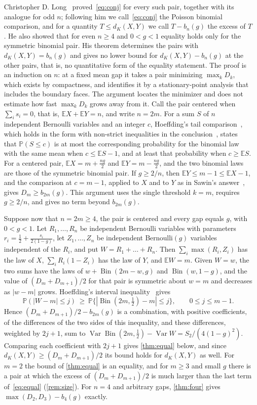 \documentclass[11pt,a4paper]{article}
\numberwithin{equation}{section}
\theoremstyle{remark}
\newcommand{\Pp}{\mathbb P}
\newcommand{\E}{\mathbb E}
\newcommand{\Bin}{\operatorname{Bin}}
\begin{document}
Christopher D. Long~\cite[Theorem~1.1]{Long} proved~\eqref{eq:conj} for every such pair, together
with its analogue for odd $n$; following him we call~\eqref{eq:conj} the Poisson binomial comparison, and for a quantity $T\le d_K(X,Y)$ we call $T-b_n(g)$ the excess of $T$. He also showed that for even $n\ge4$ and $0<g<1$ equality holds only for
the symmetric binomial pair. His theorem determines the pairs with $d_K(X,Y)=b_n(g)$ and gives no
lower bound for $d_K(X,Y)-b_n(g)$ at the other pairs, that is, no quantitative form of the equality statement. The proof is an induction on $n$: at a fixed mean gap it takes a pair minimizing $\max_kD_k$, which exists by compactness, and identifies it by a stationary-point analysis that includes the boundary faces. The argument locates the minimizer and does not estimate how fast $\max_kD_k$ grows away from it. Call the pair centered when $\sum_is_i=0$,
that is, $\E X+\E Y=n$, and write $n=2m$. For a sum $S$ of $n$ independent Bernoulli variables and an
integer $c$, Hoeffding's tail comparison~\cite[Theorem~4]{Hoeffding}, which holds in the form with non-strict
inequalities in the conclusion~\cite[Theorem~2.1(1)]{TangTang}, states that $\Pp(S\le c)$ is at most the
corresponding probability for the binomial law with the same mean when $c\le\E S-1$, and at least
that probability when $c\ge\E S$. For a centered pair, $\E X=m+\frac{ng}2$ and
$\E Y=m-\frac{ng}2$, and the two binomial laws are those of the symmetric binomial pair. If
$g\ge2/n$, then $\E Y\le m-1\le\E X-1$, and the comparison at $c=m-1$, applied to $X$ and to $Y$ as
in Sawin's answer~\cite{Sawin}, gives $D_m\ge b_{2m}(g)$. This argument uses the single threshold $k=m$, requires
$g\ge2/n$, and gives no term beyond $b_{2m}(g)$.

Suppose now that $n=2m\ge4$, the pair is centered and every gap equals $g$, with $0<g<1$. Let $R_1,\dots,R_n$ be independent Bernoulli
variables with parameters $r_i=\frac12+\frac{s_i}{2(1-g)}$, let $Z_1,\dots,Z_n$ be independent
Bernoulli$(g)$ variables independent of the $R_i$, and put $W=R_1+\dots+R_n$. Then
$\sum_i\max(R_i,Z_i)$ has the law of $X$, $\sum_iR_i(1-Z_i)$ has the law of $Y$, and $\E W=m$.
Given $W=w$, the two sums have the laws of $w+\Bin(2m-w,g)$ and $\Bin(w,1-g)$, and the value of
$(D_m+D_{m+1})/2$ for that pair is symmetric about $w=m$ and decreases as $|w-m|$ grows.
Hoeffding's interval inequality~\cite[Theorem~5]{Hoeffding} gives
\[
\Pp(|W-m|\le j)\ \ge\ \Pp\bigl\{|\Bin(2m,\tfrac12)-m|\le j\bigr\},\qquad 0\le j\le m-1 .
\]
Hence $(D_m+D_{m+1})/2-b_{2m}(g)$ is a combination, with positive coefficients, of the differences
of the two sides of this inequality, and these differences, weighted by $2j+1$, sum to
$\operatorname{Var}\Bin(2m,\tfrac12)-\operatorname{Var}W=S_2/(4(1-g)^2)$. Comparing each coefficient with $2j+1$ gives \cref{thm:equal} below, and since
$d_K(X,Y)\ge(D_m+D_{m+1})/2$ its bound holds for $d_K(X,Y)$ as well. For $m=2$ the bound of \cref{thm:equal} is an equality, and for $m\ge3$ and small $g$ there is a pair at which the excess of $(D_m+D_{m+1})/2$ is much larger than the last term of~\eqref{eq:equal} (\cref{rem:size}). For $n=4$ and arbitrary gaps,
\cref{thm:four} gives $\max(D_2,D_3)-b_4(g)$ exactly.
\end{document}
